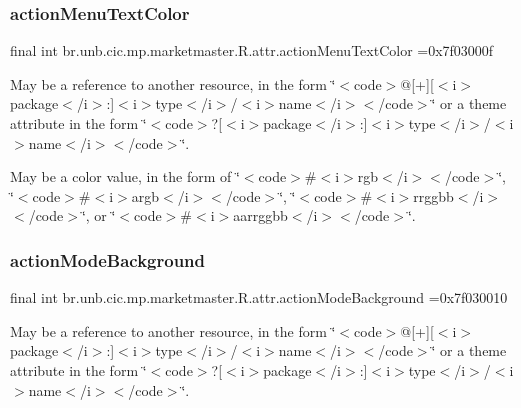 \subsubsection{\texorpdfstring{action\+Menu\+Text\+Color}{actionMenuTextColor}}
{\footnotesize\ttfamily final int br.\+unb.\+cic.\+mp.\+marketmaster.\+R.\+attr.\+action\+Menu\+Text\+Color =0x7f03000f\hspace{0.3cm}{\ttfamily [static]}}

May be a reference to another resource, in the form \char`\"{}$<$code$>$@\mbox{[}+\mbox{]}\mbox{[}$<$i$>$package$<$/i$>$\+:\mbox{]}$<$i$>$type$<$/i$>$/$<$i$>$name$<$/i$>$$<$/code$>$\char`\"{} or a theme attribute in the form \char`\"{}$<$code$>$?\mbox{[}$<$i$>$package$<$/i$>$\+:\mbox{]}$<$i$>$type$<$/i$>$/$<$i$>$name$<$/i$>$$<$/code$>$\char`\"{}. 

May be a color value, in the form of \char`\"{}$<$code$>$\#$<$i$>$rgb$<$/i$>$$<$/code$>$\char`\"{}, \char`\"{}$<$code$>$\#$<$i$>$argb$<$/i$>$$<$/code$>$\char`\"{}, \char`\"{}$<$code$>$\#$<$i$>$rrggbb$<$/i$>$$<$/code$>$\char`\"{}, or \char`\"{}$<$code$>$\#$<$i$>$aarrggbb$<$/i$>$$<$/code$>$\char`\"{}. \mbox{\label{classbr_1_1unb_1_1cic_1_1mp_1_1marketmaster_1_1R_1_1attr_acf0c54b0a3405807b2afed9362cccc3a}} 
\subsubsection{\texorpdfstring{action\+Mode\+Background}{actionModeBackground}}
{\footnotesize\ttfamily final int br.\+unb.\+cic.\+mp.\+marketmaster.\+R.\+attr.\+action\+Mode\+Background =0x7f030010\hspace{0.3cm}{\ttfamily [static]}}

May be a reference to another resource, in the form \char`\"{}$<$code$>$@\mbox{[}+\mbox{]}\mbox{[}$<$i$>$package$<$/i$>$\+:\mbox{]}$<$i$>$type$<$/i$>$/$<$i$>$name$<$/i$>$$<$/code$>$\char`\"{} or a theme attribute in the form \char`\"{}$<$code$>$?\mbox{[}$<$i$>$package$<$/i$>$\+:\mbox{]}$<$i$>$type$<$/i$>$/$<$i$>$name$<$/i$>$$<$/code$>$\char`\"{}. \mbox{\label{classbr_1_1unb_1_1cic_1_1mp_1_1marketmaster_1_1R_1_1attr_a2eb7b68d18b755f3c30dafa306e42c08}} 
